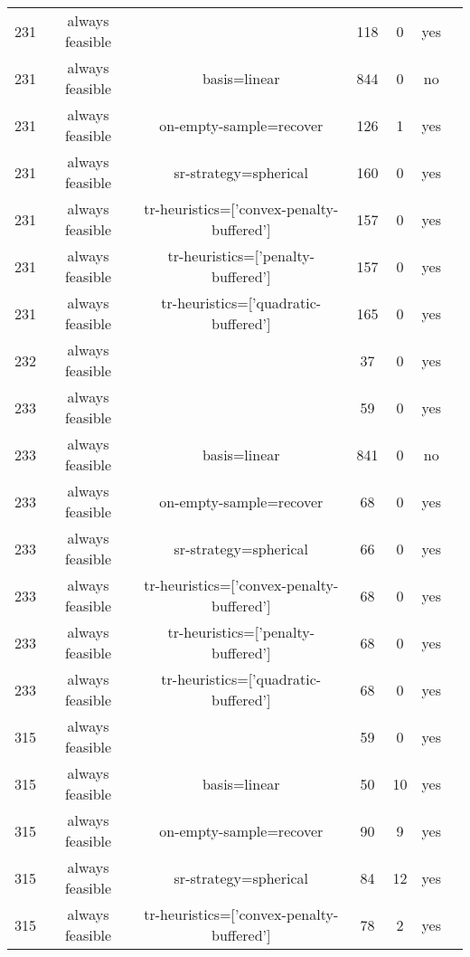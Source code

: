 \begin{scriptsize}
\begin{center}
\begin{longtable}{ccccccc}
231 & always feasible &                                           &    118 &      0 &     yes\\
231 & always feasible &                              basis=linear &    844 &      0 &      no\\
231 & always feasible &                   on-empty-sample=recover &    126 &      1 &     yes\\
231 & always feasible &                     sr-strategy=spherical &    160 &      0 &     yes\\
231 & always feasible & tr-heuristics=['convex-penalty-buffered'] &    157 &      0 &     yes\\
231 & always feasible &        tr-heuristics=['penalty-buffered'] &    157 &      0 &     yes\\
231 & always feasible &      tr-heuristics=['quadratic-buffered'] &    165 &      0 &     yes\\
232 & always feasible &                                           &     37 &      0 &     yes\\
233 & always feasible &                                           &     59 &      0 &     yes\\
233 & always feasible &                              basis=linear &    841 &      0 &      no\\
233 & always feasible &                   on-empty-sample=recover &     68 &      0 &     yes\\
233 & always feasible &                     sr-strategy=spherical &     66 &      0 &     yes\\
233 & always feasible & tr-heuristics=['convex-penalty-buffered'] &     68 &      0 &     yes\\
233 & always feasible &        tr-heuristics=['penalty-buffered'] &     68 &      0 &     yes\\
233 & always feasible &      tr-heuristics=['quadratic-buffered'] &     68 &      0 &     yes\\
315 & always feasible &                                           &     59 &      0 &     yes\\
315 & always feasible &                              basis=linear &     50 &     10 &     yes\\
315 & always feasible &                   on-empty-sample=recover &     90 &      9 &     yes\\
315 & always feasible &                     sr-strategy=spherical &     84 &     12 &     yes\\
315 & always feasible & tr-heuristics=['convex-penalty-buffered'] &     78 &      2 &     yes\\

\end{longtable}
\end{center}
\end{scriptsize}
